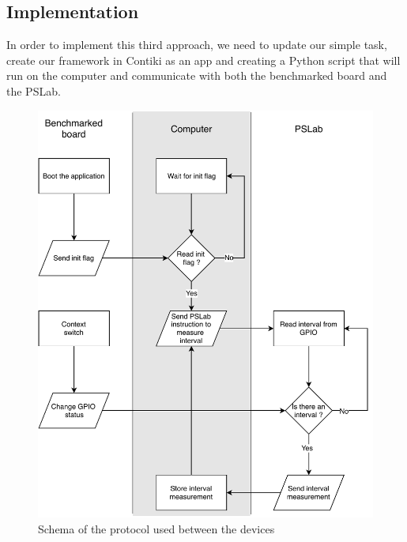 \subsection{Implementation}

In order to implement this third approach, we need to update our simple task, create our framework in Contiki as an app and creating a Python script that will run on the computer and communicate with both the benchmarked board and the PSLab.

% 

\begin{figure}[!ht]
  \centering
  \includegraphics[scale=0.7]{assets/external-protocol.pdf}
  \caption{\label{fig:external-protocol}Schema of the protocol used between the devices}
\end{figure}



